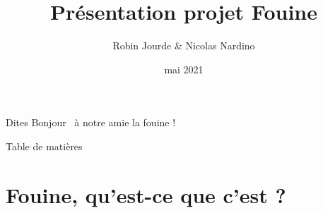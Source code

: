 \documentclass{beamer}
\title{Présentation projet Fouine}
\author{Robin Jourde \& Nicolas Nardino}
\date{mai 2021}
\begin{document}
\begin{frame}
  \titlepage
\end{frame}


\begin{frame}{Dites \og Bonjour \fg~à notre amie la fouine !}
  \begin{center}
    \tiny
    
  \end{center}
\end{frame}


\begin{frame}{Table de matières}
  \tableofcontents
\end{frame}


\section{Fouine, qu'est-ce que c'est ?}
\begin{frame}{}
  
\end{frame}
\end{document}
